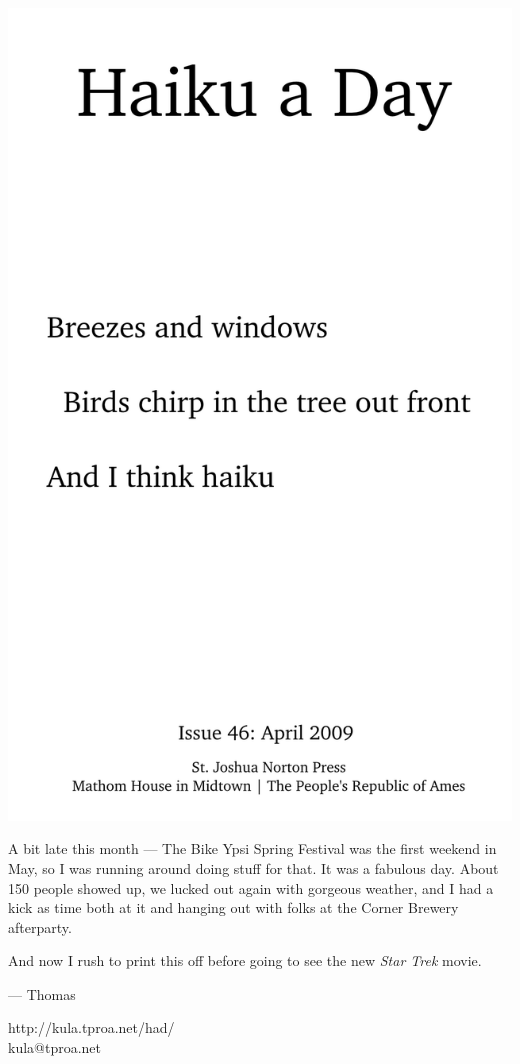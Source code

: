 \documentclass[12pt]{article}
\begin{document}
\includegraphics{frontpage.png}

\newpage

A bit late this month --- The Bike Ypsi Spring Festival was
the first weekend in May, so I was running around doing stuff
for that. It was a fabulous day. About 150 people showed up,
we lucked out again with gorgeous weather, and I had a kick
as time both at it and hanging out with folks at the Corner
Brewery afterparty.

And now I rush to print this off before going to see the new
{\em Star Trek} movie.

--- Thomas

http://kula.tproa.net/had/ \\
kula@tproa.net
\end{document}
